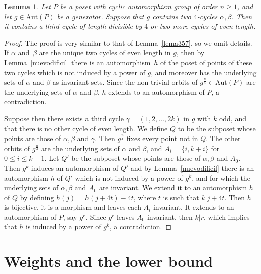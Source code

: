 \documentclass[10pt,a4paper]{amsart}
\renewcommand{\varphi}{h}
\newcommand{\aut}{\textrm{Aut}}
\theoremstyle{plain}
\newtheorem{lema}[cdrthm]{Lemma}
\theoremstyle{definition}
\theoremstyle{remark}
\begin{document}
\begin{lema} \label{lema4}
Let $P$ be a poset with cyclic automorphism group of order $n\ge 1$, and let $g\in \aut (P)$ be a generator. Suppose that $g$ contains two $4$-cycles $\alpha, \beta$. Then it contains a third cycle of length divisible by $4$ or two more cycles of even length. 
\end{lema}

\begin{proof}
The proof is very similar to that of Lemma~\ref{lema357}, so we omit details. If $\alpha$ and~$\beta$ are the unique two cycles of even length in $g$, then by Lemma~\ref{nuevodificil} there is an automorphism~$h$ of the poset of points of these two cycles which is not induced by a power of $g$, and moreover has the underlying sets of $\alpha$ and $\beta$ as invariant sets. Since the non-trivial orbits of $g^{\frac{n}{4}}\in \aut(P)$ are the underlying sets of $\alpha$ and $\beta$, $h$ extends to an automorphism of $P$, a contradiction.  

Suppose then there exists a third cycle $\gamma=(1,2,\ldots, 2k)$ in $g$ with $k$ odd, and that there is no other cycle of even length. We define $Q$ to be the subposet whose points are those of $\alpha, \beta$ and $\gamma$. Then $g^{\frac{n}{4}}$ fixes every point not in $Q$. The other orbits of $g^{\frac{n}{4}}$ are the underlying sets of $\alpha$ and $\beta$, and $A_i=\{i,k+i\}$ for $0\le i\le k-1$. Let $Q'$ be the subposet whose points are those of $\alpha, \beta$ and $A_0$. Then $g^k$ induces an automorphism of $Q'$ and by Lemma~\ref{nuevodificil} there is an automorphism $\varphi$ of $Q'$ which is not induced by a power of $g^k$, and for which the underlying sets of $\alpha, \beta$ and $A_0$ are invariant. We extend it to an automorphism $\overline{\varphi}$ of $Q$ by defining $\overline{\varphi}(j)=\varphi(j+4t)-4t$, where $t$ is such that $k|j+4t$. Then $\overline{\varphi}$ is bijective, it is a morphism and leaves each $A_i$ invariant. It extends to an automorphism of $P$, say $g^r$. Since $g^r$ leaves $A_0$ invariant, then $k|r$, which implies that $h$ is induced by a power of $g^k$, a contradiction.
\end{proof}

\section{Weights and the lower bound}  \label{sectionweights}
\end{document}
